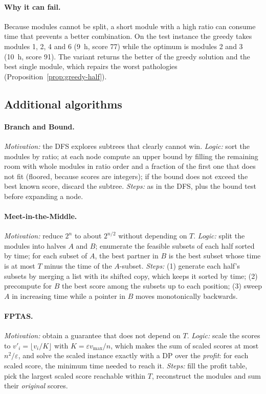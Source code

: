 \paragraph{Why it can fail.} Because modules cannot be split, a short module with a high ratio can consume time that prevents a better combination. On the test instance the greedy takes modules 1, 2, 4 and 6 (9~h, score 77) while the optimum is modules 2 and 3 (10~h, score 91). The variant  returns the better of the greedy solution and the best single module, which repairs the worst pathologies (Proposition~\ref{prop:greedy-half}).

\subsection{Additional algorithms}\label{sec:design-extra}

\paragraph{Branch and Bound.} \emph{Motivation:} the DFS explores subtrees that clearly cannot win. \emph{Logic:} sort the modules by ratio; at each node compute an upper bound by filling the remaining room with whole modules in ratio order and a fraction of the first one that does not fit (floored, because scores are integers); if the bound does not exceed the best known score, discard the subtree. \emph{Steps:} as in the DFS, plus the bound test before expanding a node.

\paragraph{Meet-in-the-Middle.} \emph{Motivation:} reduce $2^n$ to about $2^{n/2}$ without depending on $T$. \emph{Logic:} split the modules into halves $A$ and $B$; enumerate the feasible subsets of each half sorted by time; for each subset of $A$, the best partner in $B$ is the best subset whose time is at most $T$ minus the time of the $A$-subset. \emph{Steps:} (1) generate each half's subsets by merging a list with its shifted copy, which keeps it sorted by time; (2) precompute for $B$ the best score among the subsets up to each position; (3) sweep $A$ in increasing time while a pointer in $B$ moves monotonically backwards.

\paragraph{FPTAS.} \emph{Motivation:} obtain a guarantee that does not depend on $T$. \emph{Logic:} scale the scores to $v'_i=\lfloor v_i/K\rfloor$ with $K=\varepsilon v_{\max}/n$, which makes the sum of scaled scores at most $n^2/\varepsilon$, and solve the scaled instance exactly with a DP over the \emph{profit}: for each scaled score, the minimum time needed to reach it. \emph{Steps:} fill the profit table, pick the largest scaled score reachable within $T$, reconstruct the modules and sum their \emph{original} scores.

